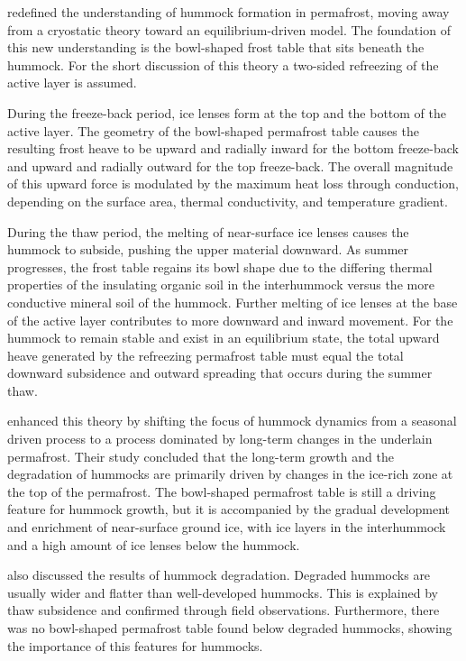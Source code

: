\citet{mackayOriginHummocksWestern1980} redefined the understanding of hummock formation in permafrost, moving away from a cryostatic theory toward an equilibrium-driven model. 
The foundation of this new understanding is the bowl-shaped frost table that sits beneath the hummock. 
For the short discussion of this theory a two-sided refreezing of the active layer is assumed.

During the freeze-back period, ice lenses form at the top and the bottom of the active layer. 
The geometry of the bowl-shaped permafrost table causes the resulting frost heave to be upward and radially inward for the bottom freeze-back and upward and radially outward for the top freeze-back. 
The overall magnitude of this upward force is modulated by the maximum heat loss through conduction, depending on the surface area, thermal conductivity, and temperature gradient.

During the thaw period, the melting of near-surface ice lenses causes the hummock to subside, pushing the upper material downward. 
As summer progresses, the frost table regains its bowl shape due to the differing thermal properties of the insulating organic soil in the interhummock versus the more conductive mineral soil of the hummock. 
Further melting of ice lenses at the base of the active layer contributes to more downward and inward movement. 
For the hummock to remain stable and exist in an equilibrium state, the total upward heave generated by the refreezing permafrost table must equal the total downward subsidence and outward spreading that occurs during the summer thaw.

\citet{kokeljStructureDynamicsEarth2007} enhanced this theory by shifting the focus of hummock dynamics from a seasonal driven process to a process dominated by long-term changes in the underlain permafrost. 
Their study concluded that the long-term growth and the degradation of hummocks are primarily driven by changes in the ice-rich zone at the top of the permafrost. 
The bowl-shaped permafrost table is still a driving feature for hummock growth, but it is accompanied by the gradual development and enrichment of near-surface ground ice, with ice layers in the interhummock and a high amount of ice lenses below the hummock. 

\citet{kokeljStructureDynamicsEarth2007} also discussed the results of hummock degradation. 
Degraded hummocks are usually wider and flatter than well-developed hummocks. 
This is explained by thaw subsidence and confirmed through field observations. 
Furthermore, there was no bowl-shaped permafrost table found below degraded hummocks, showing the importance of this features for hummocks. 

